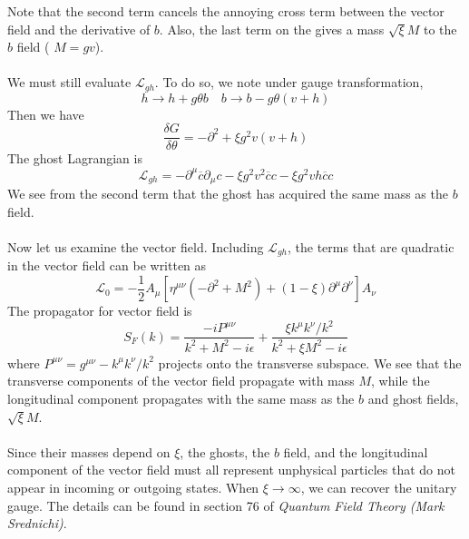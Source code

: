 \documentclass[cyan]{elegantnote}
\begin{document}
Note that the second term cancels the annoying cross term between the vector field and the derivative of $b$. Also, the last term on the gives a mass $\sqrt{\xi}M$ to the $b$ field ( $M = gv$).
\\ \\
We must still evaluate $\mathcal{L}_{gh}$. To do so, we note under gauge transformation,
\[h \to h + g\theta b \quad b \to b - g\theta(v+h)\]
Then we have
\[\frac{\delta G}{\delta \theta} = -\partial^2 + \xi g^2 v(v+h)\]
The ghost Lagrangian is
\[\mathcal{L}_{gh} = -\partial^{\mu}\overline{c}\partial_{\mu}c - \xi g^2v^2\overline{c}c - \xi g^2 vh\overline{c}c\]
We see from the second term that the ghost has acquired the same mass as the $b$ field.
\\ \\
Now let us examine the vector field. Including $\mathcal{L}_{gh}$, the terms that are quadratic in the vector field can be written as
\[\mathcal{L}_0 = - \frac{1}{2}A_{\mu} \left[ \eta^{\mu\nu}(-\partial^2 + M^2) + (1 - \xi)\partial^{\mu}\partial^{\nu} \right] A_{\nu}\]
The propagator for vector field is
\[S_F(k) = \frac{-iP^{\mu\nu}}{k^2+M^2-i\epsilon} + \frac{\xi k^{\mu}k^{\nu}/k^2}{k^2+ \xi M^2-i\epsilon}\]
where $P^{\mu\nu} = g^{\mu\nu} - k^{\mu}k^{\nu}/k^2$ projects onto the transverse subspace. We see that the transverse components of the vector field propagate with mass $M$, while the longitudinal component propagates with the same mass as the $b$ and ghost fields, $\sqrt{\xi}M$.
\\ \\
Since their masses depend on $\xi$, the ghosts, the $b$ field, and the longitudinal component of the vector field must all represent unphysical particles that do not appear in incoming or outgoing states. When $\xi \to \infty$, we can recover the unitary gauge. The details can be found in section 76 of \emph{Quantum Field Theory (Mark Srednichi)}.
\end{document}
